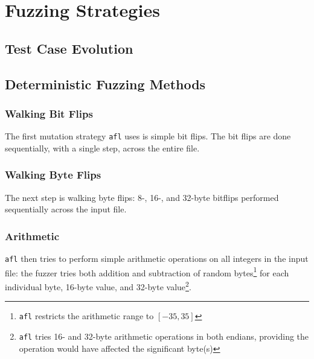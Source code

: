 
\section{Fuzzing Strategies}


\subsection{Test Case Evolution}

\subsection{Deterministic Fuzzing Methods}


\subsubsection{Walking Bit Flips}

The first mutation strategy \texttt{afl} uses is simple bit flips. The bit
flips are done sequentially, with a single step, across the entire file.

\subsubsection{Walking Byte Flips}

The next step is walking byte flips: 8-, 16-, and 32-byte bitflips performed
sequentially across the input file.

\subsubsection{Arithmetic}

\texttt{afl} then tries to perform simple arithmetic operations
on all integers in the input file: the fuzzer tries both addition and
subtraction of random bytes\footnote{\texttt{afl} restricts the arithmetic range to $[-35, 35]$\cite{afl-whitepaper}} for each
individual byte, 16-byte value, and 32-byte value\footnote{\texttt{afl} tries 16- and 32-byte arithmetic operations in both endians, providing the operation would have affected the significant byte(s)\cite{afl-whitepaper}}.

